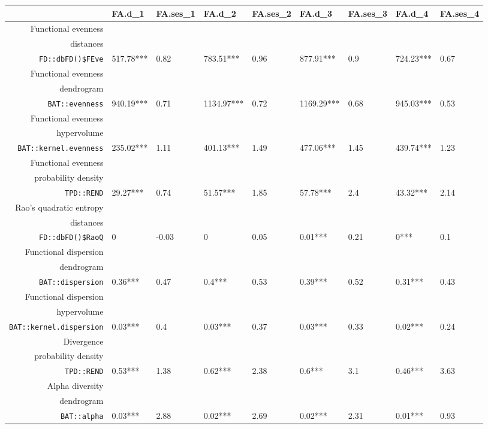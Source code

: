 \begin{table}[ht]
\scriptsize
\centering
\begin{tabular}{rllllllll}
  \hline
 & FA.d\_1 & FA.ses\_1 & FA.d\_2 & FA.ses\_2 & FA.d\_3 & FA.ses\_3 & FA.d\_4 & FA.ses\_4 \\ 
  \hline
Functional evenness\\distances\\\texttt{FD::dbFD()\$FEve} & 517.78*** & 0.82 & 783.51*** & 0.96 & 877.91*** & 0.9 & 724.23*** & 0.67 \\ 
  Functional evenness\\dendrogram\\\texttt{BAT::evenness} & 940.19*** & 0.71 & 1134.97*** & 0.72 & 1169.29*** & 0.68 & 945.03*** & 0.53 \\ 
  Functional evenness\\hypervolume\\\texttt{BAT::kernel.evenness} & 235.02*** & 1.11 & 401.13*** & 1.49 & 477.06*** & 1.45 & 439.74*** & 1.23 \\ 
  Functional evenness\\probability density\\\texttt{TPD::REND} & 29.27*** & 0.74 & 51.57*** & 1.85 & 57.78*** & 2.4 & 43.32*** & 2.14 \\ 
  Rao's quadratic entropy\\distances\\\texttt{FD::dbFD()\$RaoQ} & 0 & -0.03 & 0 & 0.05 & 0.01*** & 0.21 & 0*** & 0.1 \\ 
  Functional dispersion\\dendrogram\\\texttt{BAT::dispersion} & 0.36*** & 0.47 & 0.4*** & 0.53 & 0.39*** & 0.52 & 0.31*** & 0.43 \\ 
  Functional dispersion\\hypervolume\\\texttt{BAT::kernel.dispersion} & 0.03*** & 0.4 & 0.03*** & 0.37 & 0.03*** & 0.33 & 0.02*** & 0.24 \\ 
  Divergence\\probability density\\\texttt{TPD::REND} & 0.53*** & 1.38 & 0.62*** & 2.38 & 0.6*** & 3.1 & 0.46*** & 3.63 \\ 
  Alpha diversity\\dendrogram\\\texttt{BAT::alpha} & 0.03*** & 2.88 & 0.02*** & 2.69 & 0.02*** & 2.31 & 0.01*** & 0.93 \\ 

\end{tabular}
\end{table}
